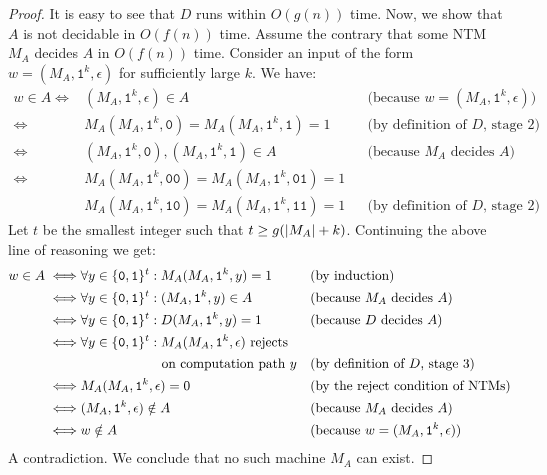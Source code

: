 \documentclass[11pt,twoside=off,numbers=noenddot]{scrbook}
\begin{document}
\begin{proof}
  It is easy to see that $D$ runs within $O(g(n))$ time. Now, we show that $A$ is not decidable in $O(f(n))$ time. Assume the contrary that some NTM $M_A$ decides $A$ in $O(f(n))$ time. Consider an input of the form $w = (M_A, \texttt{1}^k, \epsilon)$ for sufficiently large $k$. We have:
  \begin{align*}
    w \in A \iff & (M_A, \texttt{1}^k, \epsilon) \in A && \text{(because $w = (M_A, \texttt{1}^k, \epsilon)$)} \\
    \iff & M_A(M_A, \texttt{1}^k, \texttt{0}) = M_A(M_A, \texttt{1}^k, \texttt{1}) = 1 && \text{(by definition of $D$, stage 2)} \\
    \iff & (M_A, \texttt{1}^k, \texttt{0}), (M_A, \texttt{1}^k, \texttt{1}) \in A && \text{(because $M_A$ decides $A$)} \\
    \iff & M_A(M_A, \texttt{1}^k, \texttt{0}\texttt{0}) = M_A(M_A, \texttt{1}^k, \texttt{0}\texttt{1}) = 1 \\
    & M_A(M_A, \texttt{1}^k, \texttt{1}\texttt{0}) = M_A(M_A, \texttt{1}^k, \texttt{1}\texttt{1}) = 1 && \text{(by definition of $D$, stage 2)}
  \end{align*}
  Let $t$ be the smallest integer such that $t \geq g(| M_A | + k)$. Continuing the above line of reasoning we get:
  \begin{align*}
    w \in A \iff & \forall y \in \set{\texttt{0}, \texttt{1}}^t : M_A(M_A, \texttt{1}^k, y) = 1 && \text{(by induction)} \\
    \iff & \forall y \in \set{\texttt{0}, \texttt{1}}^t : (M_A, \texttt{1}^k, y) \in A && \text{(because $M_A$ decides $A$)} \\
    \iff & \forall y \in \set{\texttt{0}, \texttt{1}}^t : D(M_A, \texttt{1}^k, y) = 1 && \text{(because $D$ decides $A$)} \\
    \iff & \forall y \in \set{\texttt{0}, \texttt{1}}^t : \text{$M_A(M_A, \texttt{1}^k, \epsilon)$ rejects} \\
    & \phantom{\forall y \in \set{\texttt{0}, \texttt{1}}^t :} \ \text{on computation path $y$} && \text{(by definition of $D$, stage 3)} \\
    \iff & M_A(M_A, \texttt{1}^k, \epsilon) = 0 && \text{(by the reject condition of NTMs)} \\
    \iff & (M_A, \texttt{1}^k, \epsilon) \notin A && \text{(because $M_A$ decides $A$)} \\
    \iff & w \notin A && \text{(because $w = (M_A, \texttt{1}^k, \epsilon)$)}
  \end{align*}
  A contradiction. We conclude that no such machine $M_A$ can exist.
\end{proof}
\end{document}
